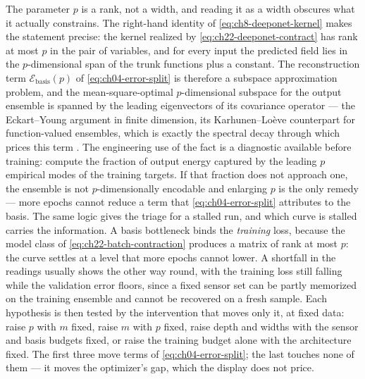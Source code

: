 The parameter $p$ is a rank, not a width, and reading it as a width obscures what it
actually constrains. The right-hand identity of \eqref{eq:ch8-deeponet-kernel} makes the
statement precise: the kernel realized by \eqref{eq:ch22-deeponet-contract} has rank at most
$p$ in the pair of variables, and for every input the predicted field lies in the
$p$-dimensional span of the trunk functions plus a constant. The reconstruction term
$\mathcal{E}_{\text{basis}}(p)$ of \eqref{eq:ch04-error-split} is therefore a subspace
approximation problem, and the mean-square-optimal $p$-dimensional subspace for the output
ensemble is spanned by the leading eigenvectors of its covariance operator --- the
Eckart--Young argument in finite dimension, its Karhunen--Lo\`eve counterpart for
function-valued ensembles, which is exactly the spectral decay through which
\cite{lanthaler2022error} prices this term
. The engineering use of the fact is a diagnostic
available before training: compute the fraction of output energy captured by the leading $p$
empirical modes of the training targets. If that fraction does not approach one, the ensemble
is not $p$-dimensionally encodable and enlarging $p$ is the only remedy --- more epochs cannot
reduce a term that \eqref{eq:ch04-error-split} attributes to the basis. The same logic gives
the triage for a stalled run, and which curve is stalled carries the information. A basis
bottleneck binds the \emph{training} loss, because the model class of
\eqref{eq:ch22-batch-contraction} produces a matrix of rank at most $p$: the curve settles at a
level that more epochs cannot lower. A shortfall in the readings usually shows the other way
round, with the training loss still falling while the validation error floors, since a fixed
sensor set can be partly memorized on the training ensemble and cannot be recovered on a fresh
sample. Each hypothesis is then tested by the intervention that moves only it, at fixed data:
raise $p$ with $m$ fixed, raise $m$ with $p$ fixed, raise depth and widths with the sensor and basis budgets fixed, or raise
the training budget alone with the architecture fixed. The first three move terms of
\eqref{eq:ch04-error-split}; the last touches none of them --- it moves the optimizer's
gap, which the display does not price.

